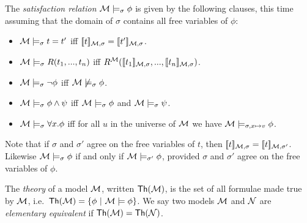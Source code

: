 \NI The \emph{satisfaction relation} $\mathcal{M} \models_{\sigma} \phi$
is given by the following clauses, this time assuming that the domain
of $\sigma$ contains all free variables of $\phi$:
\begin{itemize}

\item $\mathcal{M} \models_{\sigma} t = t'$ iff $\lbrack\!\lbrack t \rbrack\!\rbrack_{\mathcal{M}, \sigma} = \lbrack\!\lbrack t' \rbrack\!\rbrack_{\mathcal{M}, \sigma}$.
\item $\mathcal{M} \models_{\sigma} R(t_1, ..., t_n)$ iff
  $R^{\mathcal{M}}(\lbrack\!\lbrack t_1 \rbrack\!\rbrack_{\mathcal{M}, \sigma}, ..., \lbrack\!\lbrack t_n \rbrack\!\rbrack_{\mathcal{M},
  \sigma})$.
\item $\mathcal{M} \models_{\sigma} \neg \phi$ iff $\mathcal{M} \not\models_{\sigma} \phi$.
\item $\mathcal{M} \models_{\sigma} \phi \land \psi$ iff $\mathcal{M} \models_{\sigma} \phi$ and $\mathcal{M} \models_{\sigma} \psi$.
\item $\mathcal{M} \models_{\sigma} \forall x.\phi$ iff for all $u$ in the
  universe of $\mathcal{M}$ we have $\mathcal{M} \models_{\sigma, x \mapsto v} \phi$.

\end{itemize}

\NI Note that if $\sigma$ and $\sigma'$ agree on the free variables of
$t$, then $\lbrack\!\lbrack t \rbrack\!\rbrack_{\mathcal{M}, \sigma} =\lbrack\!\lbrack t \rbrack\!\rbrack_{\mathcal{M},
  \sigma'}$. Likewise $\mathcal{M} \models_{\sigma} \phi$ if and only if
$\mathcal{M} \models_{\sigma'} \phi$, provided $\sigma$ and $\sigma'$ agree
on the free variables of $\phi$.

The \emph{theory} of a model $\mathcal{M}$, written $\mathsf{Th}(\mathcal{M})$, is
the set of all formulae made true by $\mathcal{M}$, i.e.~$\mathsf{Th}(\mathcal{M})
= \{\phi\ |\ \mathcal{M}\models \phi\}$. We say two models $\mathcal{M}$ and
$\mathcal{N}$ are \emph{elementary equivalent} if $\mathsf{Th}(\mathcal{M}) =
\mathsf{Th}(\mathcal{N})$. 
